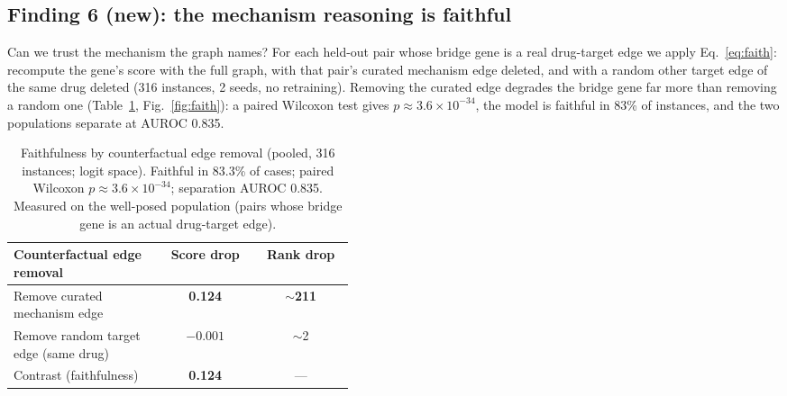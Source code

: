 \documentclass[11pt]{article}
\begin{document}
\subsection{Finding 6 (new): the mechanism reasoning is faithful}
Can we trust the mechanism the graph names? For each held-out pair whose bridge gene is a
real drug-target edge we apply Eq.~\ref{eq:faith}: recompute the gene's score with the
full graph, with that pair's curated mechanism edge deleted, and with a random other
target edge of the same drug deleted (316 instances, 2 seeds, no retraining). Removing the
curated edge degrades the bridge gene far more than removing a random one
(Table~\ref{tab:faith}, Fig.~\ref{fig:faith}): a paired Wilcoxon test gives
$p\approx3.6\times10^{-34}$, the model is faithful in 83\% of instances, and the two
populations separate at AUROC 0.835.

\begin{table}[H]
\centering\small
\begin{tabular}{>{\raggedright\arraybackslash}p{0.44\linewidth} cc}
\toprule
\rowcolor{sriblue}\color{white}\textbf{Counterfactual edge removal} & \color{white}\textbf{Score drop} & \color{white}\textbf{Rank drop}\\
\midrule
\rowcolor{srirow} Remove curated mechanism edge & \textbf{0.124} & \textbf{$\sim$211}\\
Remove random target edge (same drug) & $-0.001$ & $\sim$2\\
\midrule
Contrast (faithfulness) & \textbf{0.124} & ---\\
\bottomrule
\end{tabular}
\caption{Faithfulness by counterfactual edge removal (pooled, 316 instances; logit space).
Faithful in 83.3\% of cases; paired Wilcoxon $p\approx3.6\times10^{-34}$; separation AUROC
0.835. Measured on the well-posed population (pairs whose bridge gene is an actual
drug-target edge).}
\label{tab:faith}
\end{table}
\end{document}
